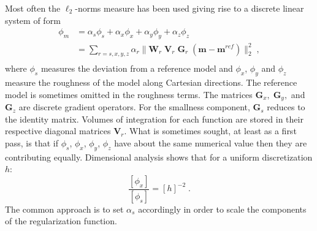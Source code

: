 Most often the $\ell_2$-norms measure has been used giving rise to a discrete linear system of form
\begin{equation}\label{leastSquaresLin}
\begin{split}
\phi_m &= \alpha_s \phi_s + \alpha_x \phi_x +\alpha_y \phi_y+\alpha_z \phi_z\\
& = \sum_{r=s,x,y,z} \alpha_r \|\mathbf{W}_r \;\mathbf{V}_r \;\mathbf{G}_r \;(\mathbf{m}-\mathbf{m}^{ref})\|_2^2 \;,\\
\end{split}
\end{equation}
where $\phi_s$ measures the deviation from a reference model and $\phi_x$, $\phi_y$ and $\phi_z$ measure the roughness of the model along Cartesian directions. The reference model is sometimes omitted in the roughness terms. The matrices $\mathbf{G}_x,\;\mathbf{G}_y,$ and $\mathbf{G}_z$ are discrete gradient operators. For the smallness component, $\mathbf{G}_s$ reduces to the identity matrix. Volumes of integration for each function are stored in their respective diagonal matrices $\mathbf{V}_r$.
What is sometimes sought, at least as a first pass, is that if $\phi_s$, $\phi_x$, $\phi_y$, $\phi_z$ have about the same numerical value then they are contributing equally. Dimensional analysis shows that for a uniform discretization $h$:
\begin{equation}\label{lengthScale}
\frac{[\phi_x] }{ [\phi_s]} = {[h]}^{-2}\;.
\end{equation}
The common approach is to set $\alpha_s$ accordingly in order to scale the components of the regularization function.

